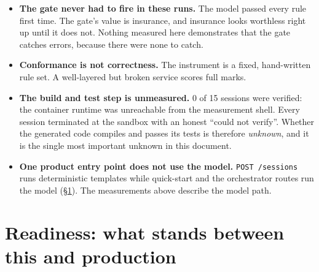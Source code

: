 \documentclass[11pt,a4paper]{article}
\begin{document}
\begin{itemize}[leftmargin=1.4em]
  \item \textbf{The gate never had to fire in these runs.} The model passed every
  rule first time. The gate's value is insurance, and insurance looks worthless
  right up until it does not. Nothing measured here demonstrates that the gate
  catches errors, because there were none to catch.
  \item \textbf{Conformance is not correctness.} The instrument is a fixed,
  hand-written rule set. A well-layered but broken service scores full marks.
  \item \textbf{The build and test step is unmeasured.} 0 of 15 sessions were
  verified: the container runtime was unreachable from the measurement shell. Every
  session terminated at the sandbox with an honest ``could not verify''. Whether the
  generated code compiles and passes its tests is therefore \emph{unknown}, and it is
  the single most important unknown in this document.
  \item \textbf{One product entry point does not use the model.}
  \texttt{POST /sessions} runs deterministic templates while quick-start and the
  orchestrator routes run the model (\S\ref{sec:blocker}). The measurements above
  describe the model path.
\end{itemize}

\section{Readiness: what stands between this and production}
\label{sec:blocker}
\end{document}

